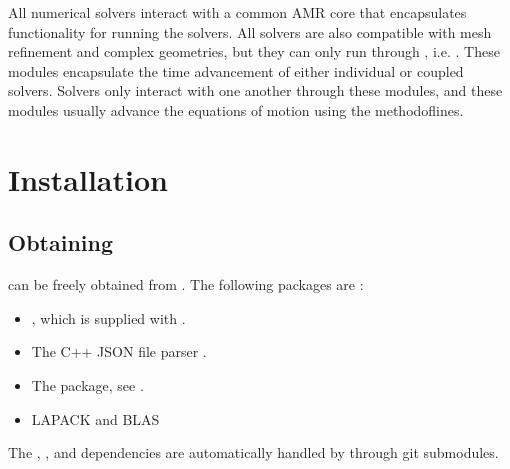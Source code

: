 \documentclass[letterpaper,10pt,english]{sphinxmanual}
\begin{document}
\sphinxAtStartPar
All numerical solvers interact with a common AMR core that encapsulates functionality for running the solvers.
All solvers are also compatible with mesh refinement and complex geometries, but they can only run through , i.e. .
These modules encapsulate the time advancement of either individual or coupled solvers.
Solvers only interact with one another through these modules, and these modules usually advance the equations of motion using the method\sphinxhyphen{}of\sphinxhyphen{}lines.

\sphinxstepscope


\section{Installation}
\label{\detokenize{Base/Installation:installation}}\label{\detokenize{Base/Installation:chap-installation}}\label{\detokenize{Base/Installation::doc}}

\subsection{Obtaining }
\label{\detokenize{Base/Installation:obtaining-chombo-discharge}}
\sphinxAtStartPar
{} can be freely obtained from .
The following packages are :
\begin{itemize}
\item {} 
\sphinxAtStartPar
{}, which is supplied with .

\item {} 
\sphinxAtStartPar
The C++ JSON file parser .

\item {} 
\sphinxAtStartPar
The  package, see .

\item {} 
\sphinxAtStartPar
LAPACK and BLAS

\end{itemize}

\sphinxAtStartPar
The , , and  dependencies are automatically handled by  through git submodules.
\end{document}
